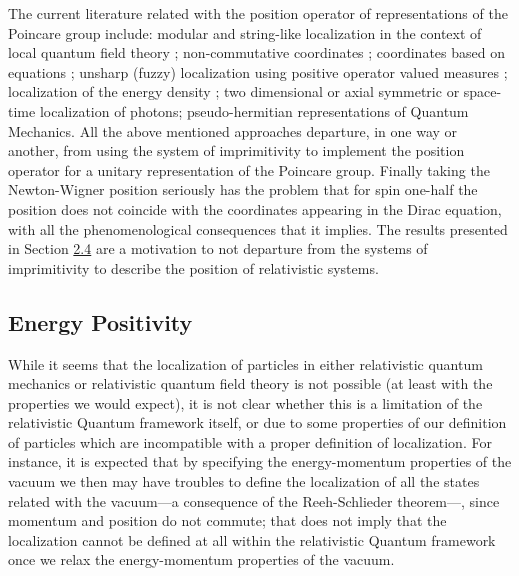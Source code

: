 \documentclass[11pt]{book}
\begin{document}
The current literature related with the position operator of
representations of the Poincare group include: modular and string-like
localization in the context of local quantum field theory
\cite{Brunetti2002Modular}\cite{Schroer2013Modular}\cite{Schroer2014Ongoing}\cite{Yngvason2014Localization}; non-commutative coordinates
\cite{Deriglazov2014Frenkel}\cite{Aguilar2013Position}; coordinates based on equations
\cite{Esposito2012Searching}\cite{Guxf3mez2013Covariant}; unsharp (fuzzy) localization using positive operator
valued measures \cite{Ali1998Systems}\cite{Busch1999Unsharp}\cite{Ali2009Commutative}\cite{Beneduci2013Uniform}\cite{Hawton2010Photon};
localization of the energy density
\cite{Wang2009Photon}\cite{Bialynicki2012Uncertainty}\cite{Wang2012Comment}\cite{Bialynicki2012Bialynicki}\cite{Terno2014Localization}; two
dimensional\cite{Saari2012Photon} or
axial symmetric\cite{Hawton2005Angular} or
space-time\cite{Hawton2012Photon}
localization of photons; pseudo-hermitian representations of Quantum
Mechanics\cite{Mostafazadeh2010Pseudo}. All the above mentioned approaches departure, in one way or
another, from using the system of imprimitivity to implement the
position operator for a unitary representation of the Poincare group.
Finally taking the Newton-Wigner position seriously has the problem that
for spin one-half the position does not coincide with the coordinates
appearing in the Dirac equation, with all the phenomenological
consequences that it
implies\cite{Fleming1999Strange}\cite{Farkas2002Poincaruxe9}. The results presented in Section
\protect\hyperlink{section:Unitary}{2.4} are a motivation to not
departure from the systems of imprimitivity to describe the position of
relativistic systems.

\hypertarget{energy-positivity}{%
\subsection{Energy Positivity}\label{energy-positivity}}

While it seems that the localization of particles in either relativistic
quantum mechanics\cite{Brunetti2002Modular} or relativistic quantum field
theory\cite{Halvorson2002No} is not possible (at least with the properties we would expect),
it is not clear whether this is a limitation of the relativistic Quantum
framework itself, or due to some properties of our definition of
particles which are incompatible with a proper definition of
localization. For instance, it is expected that by specifying the
energy-momentum properties of the vacuum we then may have troubles to
define the localization of all the states related with the vacuum---a
consequence of the Reeh-Schlieder
theorem\cite{Schlieder1965Some}---,
since momentum and position do not commute; that does not imply that the
localization cannot be defined at all within the relativistic Quantum
framework once we relax the energy-momentum properties of the vacuum.
\end{document}
